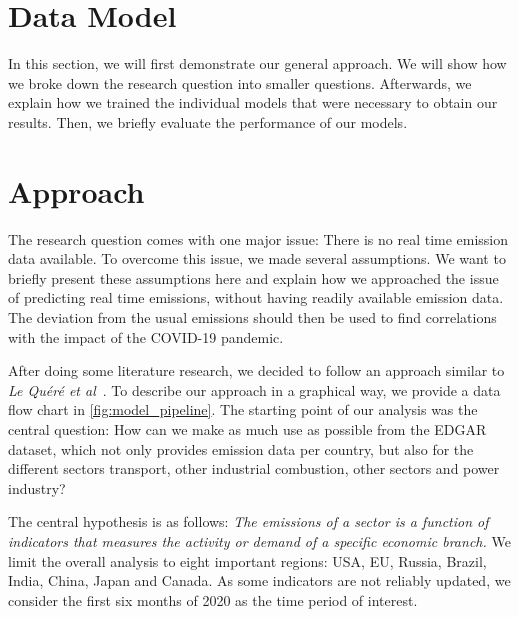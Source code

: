\section{Data Model}

In this section, we will first demonstrate our general approach. We will show how we broke down the research question into smaller questions. Afterwards, we explain how we trained the individual models that were necessary to obtain our results. Then, we briefly evaluate the performance of our models.

\section*{Approach}

The research question comes with one major issue: There is no real time \co emission data available.
To overcome this issue, we made several assumptions. We want to briefly present these assumptions here and explain how we approached the issue of predicting real time \co emissions, without having readily available emission data. The deviation from the usual emissions should then be used to find correlations with the impact of the COVID-19 pandemic. 

After doing some literature research, we decided to follow an approach similar to \textit{Le Qu{\'e}r{\'e} et al}~\cite{LeQuere2020}. To describe our approach in a graphical way, we provide a data flow chart in \autoref{fig:model_pipeline}. The starting point of our analysis was the central question: How can we make as much use as possible from the EDGAR %
dataset, which not only provides emission data per country, but also for the different sectors transport, other industrial combustion, other sectors and power industry? 

The central hypothesis is as follows: \emph{The emissions of a sector is a function of indicators that measures the activity or demand of a specific economic branch.} We limit the overall analysis to eight important regions: USA, EU, Russia, Brazil, India, China, Japan and Canada. As some indicators are not reliably updated, we consider the first six months of 2020 as the time period of interest.

